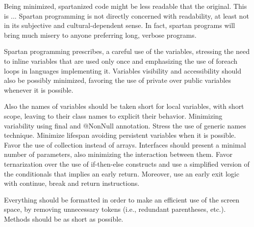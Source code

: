 Being minimized, spartanized code might be less readable that the original.
This is ... Spartan programming is not directly concerned with readability, at
least not in its subjective and cultural-dependent sense. In fact, spartan
programs will bring much misery to anyone preferring long, verbose programs.

Spartan programming prescribes, a careful use of the variables, stressing the need
to inline variables that are used only once and emphasizing the use of foreach loops
in languages implementing it. Variables visibility and accessibility should also be
possibly minimized, favoring the use of private over public variables whenever it
is possible.

Also the names of variables should be taken short for local variables, with
short scope, leaving to their class names to explicit their behavior.
Minimizing variability using final and @NonNull annotation. Stress the use of
generic names technique. Minimize lifespan avoiding persistent variables when
it is possible. Favor the use of collection instead of arrays. Interfaces
should present a minimal number of parameters, also minimizing the interaction
between them. Favor ternarization over the use of if-then-else constructs and
use a simplified version of the conditionals that implies an early return.
Moreover, use an early exit logic with continue, break and return instructions.

Everything should be formatted in order to make an efficient use of the screen
space, by removing unnecessary tokens (i.e., redundant parentheses, etc.).
Methods should be as short as possible.
